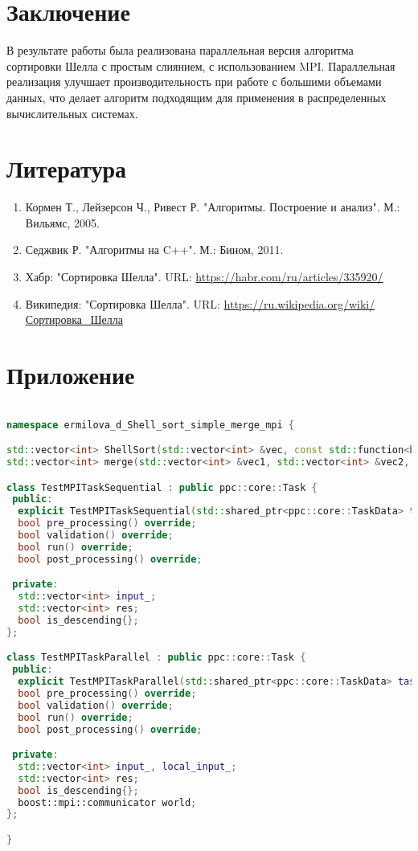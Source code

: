 \documentclass[a4paper,12pt]{article}
\begin{document}
\section{Заключение}
В результате работы была реализована параллельная версия алгоритма сортировки Шелла с простым слиянием, с использованием MPI. Параллельная реализация улучшает производительность при работе с большими объемами данных, что делает алгоритм подходящим для применения в распределенных вычислительных системах.
\newpage

\section{Литература}
\begin{enumerate}
    \item Кормен Т., Лейзерсон Ч., Ривест Р. "Алгоритмы. Построение и анализ". М.: Вильямс, 2005.
    \item Седжвик Р. "Алгоритмы на C++". М.: Бином, 2011.
    \item Хабр: "Сортировка Шелла". URL: \url{https://habr.com/ru/articles/335920/}
    \item Википедия: "Сортировка Шелла". URL: \url{https://ru.wikipedia.org/wiki/Сортировка_Шелла}
\end{enumerate}
\newpage

\section{Приложение}
\begin{lstlisting}[language=C++,caption={заголовочный файл параллельной версии}]

namespace ermilova_d_Shell_sort_simple_merge_mpi {

std::vector<int> ShellSort(std::vector<int> &vec, const std::function<bool(int, int)> &comp);
std::vector<int> merge(std::vector<int> &vec1, std::vector<int> &vec2, const std::function<bool(int, int)> &comp);

class TestMPITaskSequential : public ppc::core::Task {
 public:
  explicit TestMPITaskSequential(std::shared_ptr<ppc::core::TaskData> taskData_) : Task(std::move(taskData_)) {}
  bool pre_processing() override;
  bool validation() override;
  bool run() override;
  bool post_processing() override;

 private:
  std::vector<int> input_;
  std::vector<int> res;
  bool is_descending{};
};

class TestMPITaskParallel : public ppc::core::Task {
 public:
  explicit TestMPITaskParallel(std::shared_ptr<ppc::core::TaskData> taskData_) : Task(std::move(taskData_)) {}
  bool pre_processing() override;
  bool validation() override;
  bool run() override;
  bool post_processing() override;

 private:
  std::vector<int> input_, local_input_;
  std::vector<int> res;
  bool is_descending{};
  boost::mpi::communicator world;
};

}  
\end{lstlisting}
\end{document}

